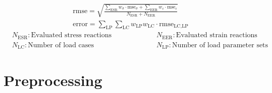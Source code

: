 \begin{center}
    \begin{gather}
        \label{eq: rmse}
            \text{rmse} = \sqrt{\frac{\displaystyle\sum_{\text{ESR}} w_{\sigma} \cdot \text{mse}_{\sigma} + \displaystyle\sum_{\text{EER}} w_{\varepsilon} \cdot \text{mse}_{\varepsilon}}{N_\text{ESR} + N_\text{EER}}} \\
            \label{eq: error}
        \text{error} = \sum_{\text{LP}} \sum_{\text{LC}} w_{\scriptscriptstyle\text{LP}} w_{\scriptscriptstyle\text{LC}} \cdot \text{rmse}_{\scriptscriptstyle \text{LC}, \text{LP}}  
    \end{gather}
    \begin{equation*}
        \begin{split}
            &N_\text{ESR}: \text{Evaluated stress reactions}\\
            &N_{\text{LC}}: \text{Number of load cases}
        \end{split}
        \hspace{2cm}
        \begin{split}
            &N_\text{EER}: \text{Evaluated strain reactions}\\
            &N_{\text{LP}}: \text{Number of load parameter sets}
        \end{split}
    \end{equation*}
\end{center}



\section{Preprocessing} \label{sec: preprocessing}


